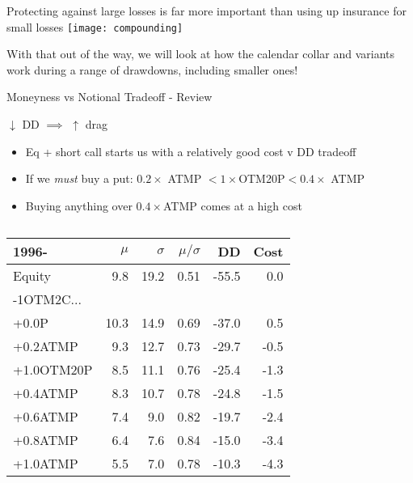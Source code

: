 \documentclass{beamer}
\begin{document}
\begin{frame}{Protecting against large losses is far more important than using up insurance for small losses}
\texttt{[image: compounding]}

With that out of the way, we will look at how the calendar collar and variants work during a range of drawdowns, including smaller ones!
\end{frame}

\begin{frame}{Moneyness vs Notional Tradeoff - Review}
\begin{block}{$\downarrow$ DD $\implies$ $\uparrow$ drag}
\begin{itemize}
\item Eq + short call starts us with a relatively good cost v DD tradeoff
\item If we {\em must} buy a put: $0.2\times$ ATMP $< 1\times$OTM20P$ < 0.4\times$ ATMP
\item Buying anything over $0.4\times$ATMP comes at a high cost
\end{itemize}
\end{block}

\begin{columns}

\begin{column}{0.5\textwidth}

\scalebox{0.7} {

\begin{tabular}{lrrrrr}
\toprule
1996- & $\mu$ & $\sigma$ & $\mu/\sigma$ & DD & Cost \\
\midrule
Equity & 9.8 & 19.2 & 0.51 & -55.5 & 0.0\\
\addlinespace
-1OTM2C...\\
+0.0P & 10.3 & 14.9 & 0.69 & -37.0 & 0.5\\
+0.2ATMP & 9.3 & 12.7 & 0.73 & -29.7 & -0.5\\
+1.0OTM20P & 8.5 & 11.1 & 0.76 & -25.4 & -1.3\\
+0.4ATMP & 8.3 & 10.7 & 0.78 & -24.8 & -1.5\\
+0.6ATMP & 7.4 & 9.0 & 0.82 & -19.7 & -2.4\\
+0.8ATMP & 6.4 & 7.6 & 0.84 & -15.0 & -3.4\\
+1.0ATMP & 5.5 & 7.0 & 0.78 & -10.3 & -4.3\\
\bottomrule
\end{tabular}

}

\end{column}


\end{columns}
\end{frame}
\end{document}
